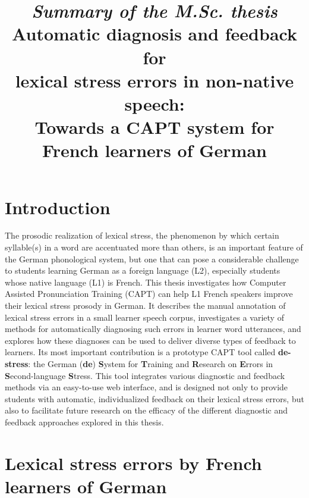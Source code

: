 \documentclass[11pt,a4paper,onecolumn]{article}
\title{\textit{Summary of the M.Sc. thesis}\\
Automatic diagnosis and feedback for\\lexical stress errors in non-native speech:\\
Towards a CAPT system for\\French learners of German}
\begin{document}
\maketitle

\section{Introduction}

The prosodic realization of lexical stress, the phenomenon by which certain syllable(s) in a word are accentuated more than others, is an important feature of the German phonological system, but one that can pose a considerable challenge to students learning German as a foreign language (L2), especially students whose native language (L1) is French. This thesis investigates how Computer Assisted Pronunciation Training (CAPT) can help L1 French speakers improve their lexical stress prosody in German. It describes the manual annotation of lexical stress errors in a small learner speech corpus, investigates a variety of methods for automatically diagnosing such errors in learner word utterances, and explores how these diagnoses can be used to deliver diverse types of feedback to learners.  Its most important contribution is a prototype CAPT tool called
\textbf{de-stress}: the German (\textbf{de}) \textbf{S}ystem for \textbf{T}raining and \textbf{R}esearch on \textbf{E}rrors in \textbf{S}econd-language \textbf{S}tress. 
%
This tool integrates various diagnostic and feedback methods via an easy-to-use web interface, and is designed not only to provide students with automatic, individualized feedback on their lexical stress errors, but also to facilitate future research on the efficacy of the different diagnostic and feedback approaches explored in this thesis.



\section{Lexical stress errors by French learners of German}
\label{sec:lexstress}
\end{document}
